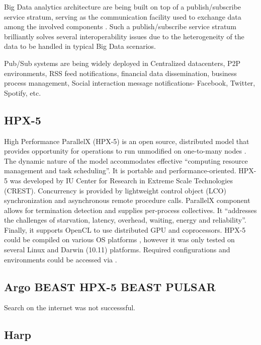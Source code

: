      Big Data analytics architecture are being built on top of a
     publish/subscribe service stratum, serving as the communication
     facility used to exchange data among the involved components
     \cite{paper-pub-sub-bigdata}. Such a publish/subscribe service
     stratum brilliantly solves several interoperability issues due to
     the heterogeneity of the data to be handled in typical Big Data
     scenarios.

     Pub/Sub systems are being widely deployed in Centralized
     datacenters, P2P environments, RSS feed notifications, financial
     data dissemination, business process management, Social
     interaction message notifications- Facebook, Twitter, Spotify,
     etc.

     \pv

\subsection{HPX-5}

     High Performance ParallelX (HPX-5)
     is an open source, distributed model that provides opportunity
     for operations to run unmodified on one-to-many nodes \cite{www-hpx-5}.
     The
     dynamic nature of the model accommodates effective ``computing
     resource management and task scheduling''. It is portable and
     performance-oriented. HPX-5 was developed by IU Center for
     Research in Extreme Scale Technologies (CREST). Concurrency is
     provided by lightweight control object (LCO) synchronization and
     asynchronous remote procedure calls. ParallelX component allows
     for termination detection and supplies per-process
     collectives. It ``addresses the challenges of starvation, latency,
     overhead, waiting, energy and reliability''. Finally, it supports
     OpenCL to use distributed GPU and coprocessors. HPX-5 could be
     compiled on various OS platforms , however it was only tested on
     several Linux and Darwin (10.11) platforms. Required
     configurations and environments could be accessed via
     \cite{www-hpx-5-user-guide}.

     \pv
	 
	 
\subsection{Argo BEAST HPX-5 BEAST PULSAR}

     Search on the internet was not successsful.
     
\subsection{Harp}

